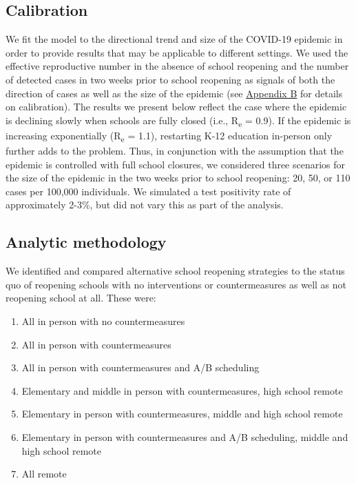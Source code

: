 \documentclass[preprint,12pt]{elsarticle}
\begin{document}
\subsection{Calibration}

We fit the model to the directional trend and size of the COVID-19 epidemic in order to provide results that may be applicable to different settings. We used the effective reproductive number in the absence of school reopening and the number of detected cases in two weeks prior to school reopening as signals of both the direction of cases as well as the size of the epidemic (see \hyperref[sec:AppendixB]{Appendix B} for details on calibration). The results we present below reflect the case where the epidemic is declining slowly when schools are fully closed (i.e., R\textsubscript{e} = 0.9). If the epidemic is increasing exponentially (R\textsubscript{e} = 1.1), restarting K-12 education in-person only further adds to the problem. Thus, in conjunction with the assumption that the epidemic is controlled with full school closures, we considered three scenarios for the size of the epidemic in the two weeks prior to school reopening: 20, 50, or 110 cases per 100,000 individuals. We simulated a test positivity rate of approximately 2-3\%, but did not vary this as part of the analysis. 

\subsection{Analytic methodology}

We identified and compared alternative school reopening strategies to the status quo of reopening schools with no interventions or countermeasures as well as not reopening school at all. These were:
\begin{enumerate}
    \item All in person with no countermeasures
    \item All in person with countermeasures
    \item All in person with countermeasures and A/B scheduling
    \item Elementary and middle in person with countermeasures, high school remote
    \item Elementary in person with countermeasures, middle and high school remote
    \item Elementary in person with countermeasures and A/B scheduling, middle and high school remote
    \item All remote
\end{enumerate}
\end{document}

